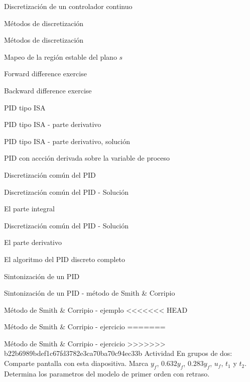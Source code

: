 \documentclass[presentation,aspectratio=1610]{beamer}
\begin{document}
\begin{frame}[label={sec:org86d23da}]{Discretización de un controlador continuo}
\begin{frame}[label={sec:org3ca2082}]{Métodos de discretización}
\begin{frame}[label={sec:orga78cff2}]{Métodos de discretización}
\begin{frame}[label={sec:org28bff53}]{Mapeo de la región estable del plano \(s\)}
\begin{frame}[label={sec:org9bb57fa}]{Forward difference exercise}
\begin{frame}[label={sec:orgaf8c1b0}]{Backward difference exercise}
\begin{frame}[label={sec:orgb2215e6}]{PID tipo ISA}
\begin{frame}[label={sec:orga06296a}]{PID tipo ISA - parte derivativo}
\begin{frame}[label={sec:org978e098}]{PID tipo ISA - parte derivativo, solución}
\begin{frame}[label={sec:orgf3b475b}]{PID con accción derivada sobre la variable de proceso}
\begin{frame}[label={sec:org5c3258e}]{Discretización común del PID}
\begin{frame}[label={sec:org95130b5}]{Discretización común del PID - Solución}
\begin{block}{El parte integral}
\begin{frame}[label={sec:org35f72c2}]{Discretización común del PID - Solución}
\begin{block}{El parte derivativo}
\begin{frame}[label={sec:org34749bc}]{El algoritmo del PID discreto completo}
\begin{frame}[label={sec:orgaefa60b}]{Sintonización de un PID}
\begin{frame}[label={sec:orge6db74e}]{Sintonización de un PID - método de Smith \& Corripio}
\begin{frame}[label={sec:org7d7b902}]{Método de Smith \& Corripio - ejemplo}
<<<<<<< HEAD
\begin{frame}[label={sec:org7c57aa3}]{Método de Smith \& Corripio - ejercicio}
=======
\begin{frame}[label={sec:org958c750}]{Método de Smith \& Corripio - ejercicio}
>>>>>>> b22b6989bdef1c67fd3782e3ca70ba70c94ec33b
\alert{Actividad} En grupos de dos: Comparte pantalla con esta diapositiva. Marca \(y_f\), \(0.632y_f\), \(0.283y_f\), \(u_f\), \(t_1\) y \(t_2\). Determina los parametros del modelo de primer orden con retraso.

\def\uampl{0.5}
\def\ttdelay{0.3}
\def\TTcnst{1.6}
\def\ggain{3}

\pgfmathsetmacro{\yfinal}{\uampl*\ggain}
\pgfmathsetmacro{\two}{\tdelay + \Tcnst}



\end{frame}
\end{frame}
\end{frame}
\end{frame}
\end{frame}
\end{frame}
\end{block}
\end{frame}
\end{block}
\end{frame}
\end{frame}
\end{frame}
\end{frame}
\end{frame}
\end{frame}
\end{frame}
\end{frame}
\end{frame}
\end{frame}
\end{frame}
\end{frame}
\end{document}
